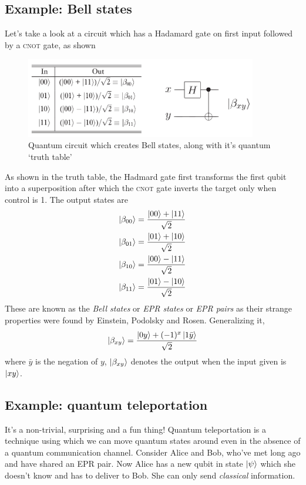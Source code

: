 \subsection{Example: Bell states}
Let's take a look at a circuit which has a Hadamard gate on first input followed by a \textsc{cnot} gate, as shown
\begin{figure}[H]
    \centering
    \includegraphics[width=0.9\textwidth]{images/bell_circuit.png}
    \caption{Quantum circuit which creates Bell states, along with it's quantum `truth table'}
    \label{fig:bell-circuit}
\end{figure}
As shown in the truth table, the Hadmard gate first transforms  the first qubit into a superposition after which the \textsc{cnot} gate inverts the target only when control is 1. The output states are
\begin{align}
    \ket{\beta_{00}} &= \frac{\ket{00}+\ket{11}}{\sqrt{2}} \\
    \ket{\beta_{01}} &= \frac{\ket{01}+\ket{10}}{\sqrt{2}} \\
    \ket{\beta_{10}} &= \frac{\ket{00}-\ket{11}}{\sqrt{2}} \\
    \ket{\beta_{11}} &= \frac{\ket{01}-\ket{10}}{\sqrt{2}} 
\end{align}
These are known as the \textit{Bell states} or \textit{EPR states} or \textit{EPR pairs} as their strange properties were found by Einstein, Podolsky and Rosen. Generalizing it,
\begin{equation}
    \ket{\beta_{xy}} = \frac{\ket{0y}+(-1)^x\ket{1\bar{y}}}{\sqrt{2}}
\end{equation}
where $\bar{y}$ is the negation of $y$, $\ket{\beta_{xy}}$ denotes the output when the input given is $\ket{xy}$.

\subsection{Example: quantum teleportation}
It's a non-trivial, surprising and a fun thing! Quantum teleportation is a technique using which we can move quantum states around even in the absence of a quantum communication channel. Consider Alice and Bob, who've met long ago and have shared an EPR pair. Now Alice has a new qubit in state $\ket{\psi}$ which she doesn't know and has to deliver to Bob. She can only send \textit{classical} information. 

